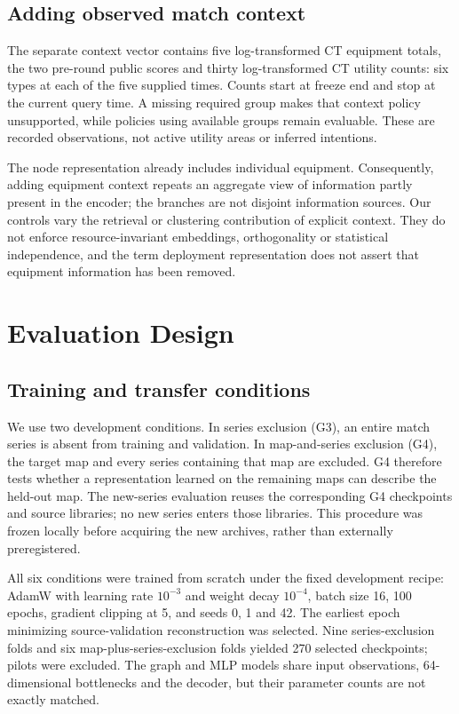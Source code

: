 \subsection{Adding observed match context}
The separate context vector contains five log-transformed CT equipment totals, the two pre-round public scores and thirty log-transformed CT utility counts: six types at each of the five supplied times. Counts start at freeze end and stop at the current query time. A missing required group makes that context policy unsupported, while policies using available groups remain evaluable. These are recorded observations, not active utility areas or inferred intentions. %

The node representation already includes individual equipment. Consequently, adding equipment context repeats an aggregate view of information partly present in the encoder; the branches are not disjoint information sources. Our controls vary the retrieval or clustering contribution of explicit context. They do not enforce resource-invariant embeddings, orthogonality or statistical independence, and the term deployment representation does not assert that equipment information has been removed. %

\section{Evaluation Design}
\subsection{Training and transfer conditions}
We use two development conditions. In series exclusion (G3), an entire match series is absent from training and validation. In map-and-series exclusion (G4), the target map and every series containing that map are excluded. G4 therefore tests whether a representation learned on the remaining maps can describe the held-out map. The new-series evaluation reuses the corresponding G4 checkpoints and source libraries; no new series enters those libraries. This procedure was frozen locally before acquiring the new archives, rather than externally preregistered.

All six conditions were trained from scratch under the fixed development recipe: AdamW with learning rate $10^{-3}$ and weight decay $10^{-4}$, batch size 16, 100 epochs, gradient clipping at 5, and seeds 0, 1 and 42. The earliest epoch minimizing source-validation reconstruction was selected. Nine series-exclusion folds and six map-plus-series-exclusion folds yielded 270 selected checkpoints; pilots were excluded. The graph and MLP models share input observations, 64-dimensional bottlenecks and the decoder, but their parameter counts are not exactly matched. %

